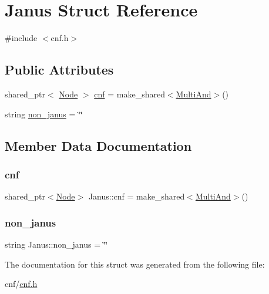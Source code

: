 \hypertarget{struct_janus}{}\section{Janus Struct Reference}
\label{struct_janus}


{\ttfamily \#include $<$cnf.\+h$>$}

\subsection*{Public Attributes}
\begin{DoxyCompactItemize}
\item 
shared\+\_\+ptr$<$ \hyperlink{class_node}{Node} $>$ \hyperlink{struct_janus_af64cf929b5ad7356e6ce7e131cd10737}{cnf} = make\+\_\+shared$<$\hyperlink{class_multi_and}{Multi\+And}$>$()
\item 
string \hyperlink{struct_janus_a764c949aa97f5ad7848eba3925df0ca7}{non\+\_\+janus} = \char`\"{}\char`\"{}
\end{DoxyCompactItemize}


\subsection{Member Data Documentation}
\mbox{\label{struct_janus_af64cf929b5ad7356e6ce7e131cd10737}} 
\subsubsection{\texorpdfstring{cnf}{cnf}}
{\footnotesize\ttfamily shared\+\_\+ptr$<$\hyperlink{class_node}{Node}$>$ Janus\+::cnf = make\+\_\+shared$<$\hyperlink{class_multi_and}{Multi\+And}$>$()}

\mbox{\label{struct_janus_a764c949aa97f5ad7848eba3925df0ca7}} 
\subsubsection{\texorpdfstring{non\+\_\+janus}{non\_janus}}
{\footnotesize\ttfamily string Janus\+::non\+\_\+janus = \char`\"{}\char`\"{}}



The documentation for this struct was generated from the following file\+:\begin{DoxyCompactItemize}
\item 
cnf/\hyperlink{cnf_8h}{cnf.\+h}\end{DoxyCompactItemize}
